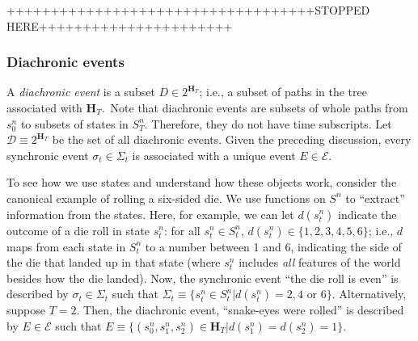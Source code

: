 \documentclass[
11pt,
titlepage,
reqno,
]{article}%
\theoremstyle{definition}
\begin{document}



	 +++++++++++++++++++++++++++++++++++STOPPED HERE++++++++++++++++++++++
	

\subsubsection{Diachronic events}
	
	A \textit{diachronic event} is a subset $D\in 2^{\mathbf{H}_T}$; i.e., a subset of paths in the tree associated with $\mathbf{H}_T$.\
	Note that diachronic events are subsets of whole paths from $s^n_0$ to subsets of states in $S^n_T$. 
	Therefore, they do not have time subscripts.
	Let $\mathcal{D}\equiv 2^{\mathbf{H}_T}$ be the set of all diachronic events.
	Given the preceding discussion, every synchronic event $\sigma_t\in\Sigma_t$ is associated with a unique event $E\in \mathcal{E}$. 

	
	To see how we use states and understand how these objects work, consider the canonical example of rolling a six-sided die. 
	We use functions on $S^n$ to ``extract'' information from the states. 
	Here, for example, we can let $d(s^n_t)$ indicate the outcome of a die roll in state $s^n_t$: for all $s^n_t\in S^n_t$, $d(s^n_t)\in\{1,2,3,4,5,6\}$; i.e., $d$ maps from each state in $S^n_t$ to a number between 1 and 6, indicating the side of the die that landed up in that state (where $s^n_t$ includes \textit{all} features of the world besides how the die landed).
	Now, the synchronic event ``the die roll is even'' is described by $\sigma_t\in\Sigma_t$ such that $\Sigma_t\equiv\{s^n_t\in S^n_t|d(s^n_t)=2,4\text{ or }6\}$. 
	Alternatively, suppose $T=2$.
	Then, the diachronic event, ``snake-eyes were rolled'' is described by $E\in\mathcal{E}$ such that $E\equiv\{(s^n_0,s^n_1,s^n_2)\in \mathbf{H}_T|d(s^n_1)=d(s^n_2)=1\}$.
	
\end{document}

